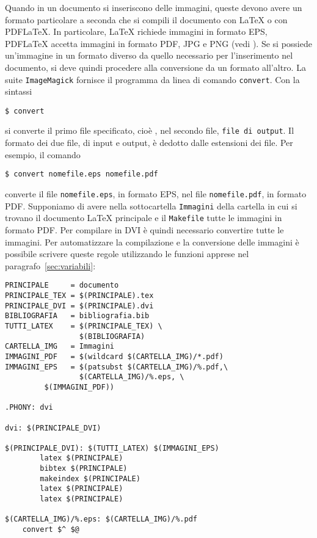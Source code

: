 Quando in un documento si inseriscono delle immagini, queste devono avere un
formato particolare a seconda che si compili il documento con \LaTeX{}
o con \textsc{PDF}\LaTeX.  In particolare, \LaTeX{}
richiede immagini in formato \textsc{EPS}, \textsc{PDF}\LaTeX{}
accetta immagini in formato \textsc{PDF}, \textsc{JPG} e \textsc{PNG} (vedi
\cite[pagina 105]{pantieri:latex}).  Se si possiede un'immagine in un formato
diverso da quello necessario per l'inserimento nel documento, si deve quindi
procedere alla conversione da un formato all'altro.  La suite
\texttt{ImageMagick} fornisce il programma da linea di comando
\texttt{convert}. Con la sintassi
\begin{sintassi}
  \texttt{\$ convert}  
\end{sintassi}
si converte il primo file specificato, cioè , nel secondo
file, \texttt{file di output}.  Il formato dei due file, di input e output, è
dedotto dalle estensioni dei file.  Per esempio, il comando
\begin{verbatim}
$ convert nomefile.eps nomefile.pdf
\end{verbatim}
converte il file \texttt{nomefile.eps}, in formato \textsc{EPS}, nel file
\texttt{nomefile.pdf}, in formato \textsc{PDF}.  Supponiamo di avere nella
sottocartella \texttt{Immagini} della cartella in cui si trovano il documento
\LaTeX{}
principale e il \texttt{Makefile} tutte le immagini in formato \textsc{PDF}.
Per compilare in \textsc{DVI} è quindi necessario convertire tutte le immagini.
Per automatizzare la compilazione e la conversione delle immagini è possibile
scrivere queste regole utilizzando le funzioni apprese nel
paragrafo~\ref{sec:variabili}:
\begin{lstlisting}[caption={\texttt{Makefile} in cui le immagini \textsc{PDF}
vengono convertite in \textsc{EPS} nella compilazione con \LaTeX.},label=lst:pdf-eps]
PRINCIPALE     = documento
PRINCIPALE_TEX = $(PRINCIPALE).tex
PRINCIPALE_DVI = $(PRINCIPALE).dvi
BIBLIOGRAFIA   = bibliografia.bib
TUTTI_LATEX    = $(PRINCIPALE_TEX) \
                 $(BIBLIOGRAFIA)
CARTELLA_IMG   = Immagini
IMMAGINI_PDF   = $(wildcard $(CARTELLA_IMG)/*.pdf)
IMMAGINI_EPS   = $(patsubst $(CARTELLA_IMG)/%.pdf,\
                 $(CARTELLA_IMG)/%.eps, \
		 $(IMMAGINI_PDF))

.PHONY: dvi

dvi: $(PRINCIPALE_DVI)

$(PRINCIPALE_DVI): $(TUTTI_LATEX) $(IMMAGINI_EPS)
        latex $(PRINCIPALE)
        bibtex $(PRINCIPALE)
        makeindex $(PRINCIPALE)
        latex $(PRINCIPALE)
        latex $(PRINCIPALE)

$(CARTELLA_IMG)/%.eps: $(CARTELLA_IMG)/%.pdf
	convert $^ $@
\end{lstlisting} %

